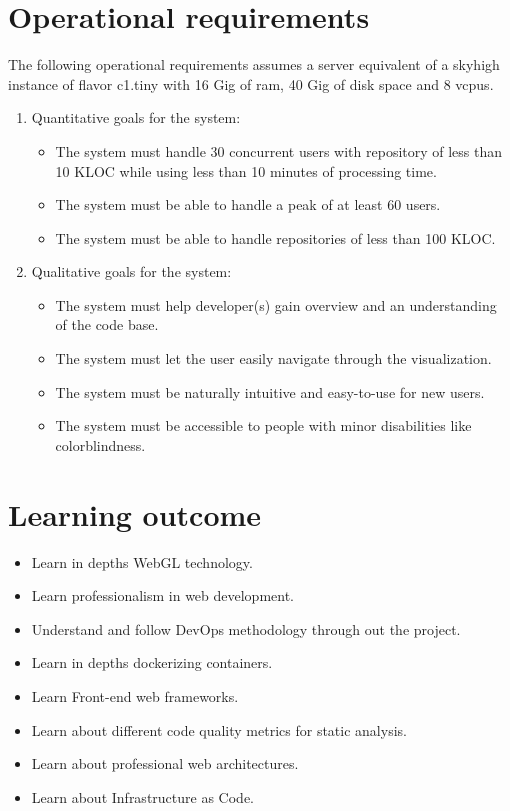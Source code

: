 \section{Operational requirements}
    The following operational requirements assumes a server equivalent of a \gls{skyhigh} instance of flavor c1.tiny with 16 Gig of ram, 40 Gig of disk space and 8 \glspl{vcpu}.  
    \begin{enumerate}  
        \item Quantitative goals for the system: 
        \begin{itemize}
            \item The system must handle 30 concurrent users with repository of less than 10 KLOC while using less than 10 minutes of processing time.
            \item The system must be able to handle a peak of at least 60 users.
            \item The system must be able to handle repositories of less than 100 KLOC. 
        \end{itemize}
        \item Qualitative goals for the system:
        \begin{itemize}
            \item The system must help developer(s) gain overview and an understanding of the code base.
            \item The system must let the user easily navigate through the visualization.
            \item The system must be naturally intuitive and easy-to-use for new users.
            \item The system must be accessible to people with minor disabilities like colorblindness. 
        \end{itemize}
    \end{enumerate}
        
\section{Learning outcome}
    \begin{itemize}
        \item Learn in depths WebGL technology.
        \item Learn professionalism in web development.
        \item Understand and follow DevOps methodology through out the project.
        \item Learn in depths dockerizing containers.
        \item Learn Front-end web frameworks.
        \item Learn about different code quality metrics for static analysis.
        \item Learn about professional web architectures.
        \item Learn about Infrastructure as Code.
    \end{itemize}

